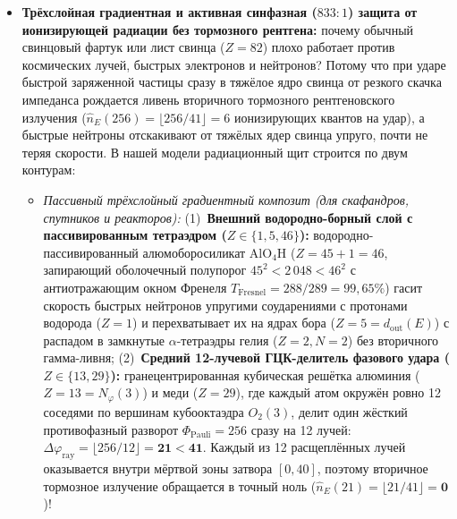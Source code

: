 \begin{itemize}[leftmargin=*]
  в 12-лучевом седле при $\Delta\varphi = 139$ протон ($Z=1, A=1$) сливается с ядром бора-11 ($Z=5=d_{\mathrm{out}}(E), N=6=|\square|, A=11=|N|-1$), и возбуждённое ядро углерода $^{12}_6\mathrm{C}^*$ распадается вдоль $d = 3$ ортогональных плоскостей Эйлера $(XY,XZ,YZ)$ ровно на \textbf{три альфа-частицы $^4_2\mathrm{He}$ с нулевым выходом свободных нейтронов} ($\Delta N_{\mathrm{free}} = 0$)! А расщепление купола кубооктаэдра на верхнюю противофазную полусферу ($\Delta\varphi_{\mathrm{top}} = 256 \implies D_{\mathrm{top}} = \varepsilon = 8\,192$) и нижнюю синфазную полусферу ($\Delta\varphi_{\mathrm{bot}} = 0 \implies D_{\mathrm{bot}} = 833\,\varepsilon = 6\,823\,936$) создаёт объёмный гравитационно-импедансный диполь $\Delta D = 832\,\varepsilon = \mathbf{6\,815\,744}$, действующий одинаково на каждый внутренний узел (ускорение без внутренних перегрузок) и одновременно работающий как двухслойный дефлекторный щит с контролем целостности всех 12 лучей.
\item \textbf{Трёхслойная градиентная и активная синфазная ($833 : 1$) защита от ионизирующей радиации без тормозного рентгена:}
  почему обычный свинцовый фартук или лист свинца ($Z = 82$) плохо работает против космических лучей, быстрых электронов и нейтронов? Потому что при ударе быстрой заряженной частицы сразу в тяжёлое ядро свинца от резкого скачка импеданса рождается ливень вторичного тормозного рентгеновского излучения ($\hat{n}_E(256) = \lfloor 256 / 41 \rfloor = 6$ ионизирующих квантов на удар), а быстрые нейтроны отскакивают от тяжёлых ядер свинца упруго, почти не теряя скорости. В нашей модели радиационный щит строится по двум контурам:
  \begin{itemize}[noitemsep]
  \item \emph{Пассивный трёхслойный градиентный композит (для скафандров, спутников и реакторов):}
    (1)~\textbf{Внешний водородно-борный слой с пассивированным тетраэдром ($Z \in \{1, 5, 46\}$):} водородно-пассивированный алюмоборосиликат $\mathrm{AlO_4H}$ ($Z = 45 + 1 = 46$, запирающий оболочечный полупорог $45^2 < 2\,048 < 46^2$ с антиотражающим окном Френеля $T_{\mathrm{Fresnel}} = 288/289 = 99{,}65\%$) гасит скорость быстрых нейтронов упругими соударениями с протонами водорода ($Z=1$) и перехватывает их на ядрах бора ($Z=5=d_{\mathrm{out}}(E)$) с распадом в замкнутые $\alpha$-тетраэдры гелия ($Z=2, N=2$) без вторичного гамма-ливня;
    (2)~\textbf{Средний 12-лучевой ГЦК-делитель фазового удара ($Z \in \{13, 29\}$):} гранецентрированная кубическая решётка алюминия ($Z=13=N_\varphi(3)$) и меди ($Z=29$), где каждый атом окружён ровно 12 соседями по вершинам кубооктаэдра $O_2(3)$, делит один жёсткий противофазный разворот $\Phi_{\mathrm{Pauli}} = 256$ сразу на 12 лучей: $\Delta\varphi_{\mathrm{ray}} = \lfloor 256 / 12 \rfloor = \mathbf{21 < 41}$. Каждый из 12 расщеплённых лучей оказывается внутри мёртвой зоны затвора $[0, 40]$, поэтому вторичное тормозное излучение обращается в точный ноль ($\hat{n}_E(21) = \lfloor 21 / 41 \rfloor = \mathbf{0}$)!

\end{itemize}
\end{itemize}

